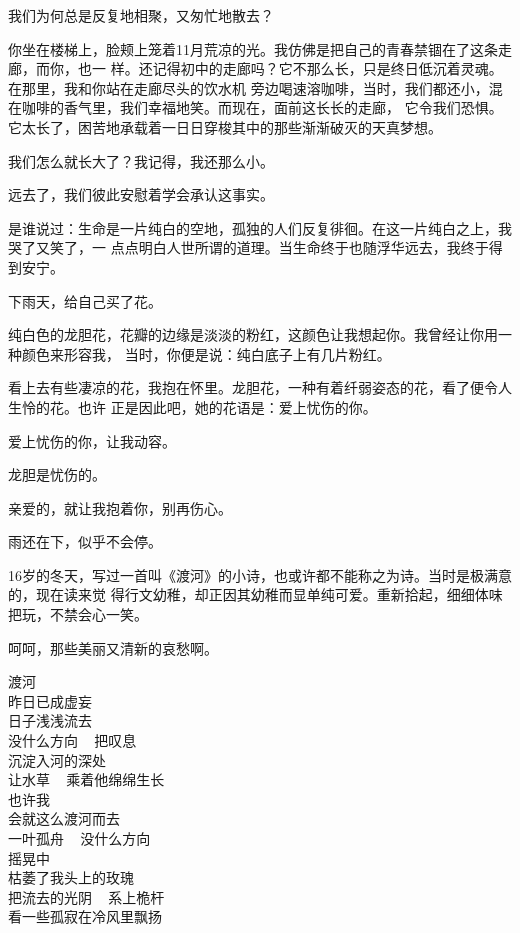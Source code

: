 		我们为何总是反复地相聚，又匆忙地散去？

		你坐在楼梯上，脸颊上笼着11月荒凉的光。我仿佛是把自己的青春禁锢在了这条走廊，而你，也一
	样。还记得初中的走廊吗？它不那么长，只是终日低沉着灵魂。在那里，我和你站在走廊尽头的饮水机
	旁边喝速溶咖啡，当时，我们都还小，混在咖啡的香气里，我们幸福地笑。而现在，面前这长长的走廊，
	它令我们恐惧。它太长了，困苦地承载着一日日穿梭其中的那些渐渐破灭的天真梦想。

		我们怎么就长大了？我记得，我还那么小。

		远去了，我们彼此安慰着学会承认这事实。

		是谁说过：生命是一片纯白的空地，孤独的人们反复徘徊。在这一片纯白之上，我哭了又笑了，一
	点点明白人世所谓的道理。当生命终于也随浮华远去，我终于得到安宁。

	\endwriting



		下雨天，给自己买了花。

		纯白色的龙胆花，花瓣的边缘是淡淡的粉红，这颜色让我想起你。我曾经让你用一种颜色来形容我，
	当时，你便是说：纯白底子上有几片粉红。

		看上去有些凄凉的花，我抱在怀里。龙胆花，一种有着纤弱姿态的花，看了便令人生怜的花。也许
	正是因此吧，她的花语是：爱上忧伤的你。

		爱上忧伤的你，让我动容。

		龙胆是忧伤的。

		亲爱的，就让我抱着你，别再伤心。

		雨还在下，似乎不会停。

	\endwriting



		16岁的冬天，写过一首叫《渡河》的小诗，也或许都不能称之为诗。当时是极满意的，现在读来觉
	得行文幼稚，却正因其幼稚而显单纯可爱。重新拾起，细细体味把玩，不禁会心一笑。

		呵呵，那些美丽又清新的哀愁啊。

		\longpoem{}{}{}
			渡河 \\
			昨日已成虚妄 \\
			日子浅浅流去 \\
			没什么方向 ~ 把叹息 \\
			沉淀入河的深处 \\
			让水草 ~ 乘着他绵绵生长 \\
			也许我 \\
			会就这么渡河而去 \\
			一叶孤舟 ~ 没什么方向 \\
			摇晃中 \\
			枯萎了我头上的玫瑰 \\
			把流去的光阴 ~ 系上桅杆 \\
			看一些孤寂在冷风里飘扬
		\endlongpoem

